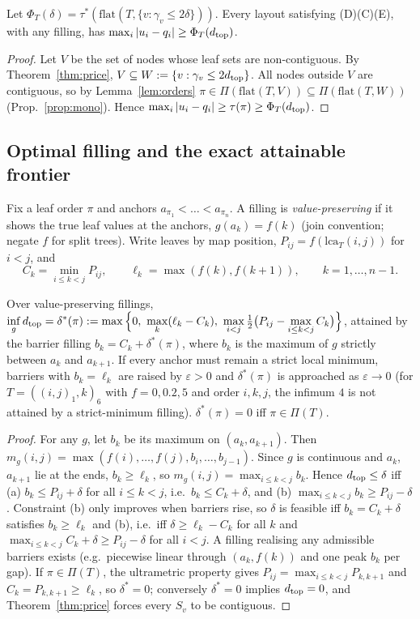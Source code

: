 \documentclass[11pt]{article}
\theoremstyle{remark}\newtheorem{remark}{Remark}
\begin{document}
\begin{corollary}\label{cor:frontier}Let $\Phi_T(\delta)=\tau^*(\mathrm{flat}(T,\{v:\gamma_v\le2\delta\}))$. Every layout satisfying (D)(C)(E), with any filling, has $\max_i|u_i-q_i|\ge\Phi_T(d_{\rm top})$.\end{corollary}
\begin{proof}Let $V$ be the set of nodes whose leaf sets are non-contiguous. By Theorem~\ref{thm:price}, $V\subseteq W:=\{v:\gamma_v\le 2d_{\rm top}\}$. All nodes outside $V$ are contiguous, so by Lemma~\ref{lem:orders} $\pi\in\Pi(\mathrm{flat}(T,V))\subseteq\Pi(\mathrm{flat}(T,W))$ (Prop.~\ref{prop:mono}). Hence $\max_i|u_i-q_i|\ge\tau(\pi)\ge\Phi_T(d_{\rm top})$.\end{proof}

\subsection*{Optimal filling and the exact attainable frontier}
Fix a leaf order $\pi$ and anchors $a_{\pi_1}<\dots<a_{\pi_n}$. A filling is \emph{value-preserving} if it shows the true leaf values at the anchors, $g(a_k)=f(k)$ (join convention; negate $f$ for split trees). Write leaves by map position, $P_{ij}=f(\mathrm{lca}_T(i,j))$ for $i<j$, and
\[C_k=\min_{i\le k<j}P_{ij},\qquad \ell_k=\max(f(k),f(k+1)),\qquad k=1,\dots,n-1.\]
\begin{proposition}\label{prop:fill}
Over value-preserving fillings, $\displaystyle\inf_g d_{\rm top}=\delta^*(\pi):=\max\Big\{0,\ \max_k(\ell_k-C_k),\ \max_{i<j}\tfrac12\big(P_{ij}-\max_{i\le k<j}C_k\big)\Big\}$, attained by the barrier filling $b_k=C_k+\delta^*(\pi)$, where $b_k$ is the maximum of $g$ strictly between $a_k$ and $a_{k+1}$. If every anchor must remain a strict local minimum, barriers with $b_k=\ell_k$ are raised by $\varepsilon>0$ and $\delta^*(\pi)$ is approached as $\varepsilon\to0$ (for $T=((i,j)_1,k)_6$ with $f=0,0.2,5$ and order $i,k,j$, the infimum $4$ is not attained by a strict-minimum filling). $\delta^*(\pi)=0$ iff $\pi\in\Pi(T)$.
\end{proposition}
\begin{proof}For any $g$, let $b_k$ be its maximum on $(a_k,a_{k+1})$. Then $m_g(i,j)=\max(f(i),\dots,f(j),b_i,\dots,b_{j-1})$. Since $g$ is continuous and $a_k$, $a_{k+1}$ lie at the ends, $b_k\ge\ell_k$, so $m_g(i,j)=\max_{i\le k<j}b_k$. Hence $d_{\rm top}\le\delta$ iff (a) $b_k\le P_{ij}+\delta$ for all $i\le k<j$, i.e.\ $b_k\le C_k+\delta$, and (b) $\max_{i\le k<j}b_k\ge P_{ij}-\delta$. Constraint (b) only improves when barriers rise, so $\delta$ is feasible iff $b_k=C_k+\delta$ satisfies $b_k\ge\ell_k$ and (b), i.e.\ iff $\delta\ge\ell_k-C_k$ for all $k$ and $\max_{i\le k<j}C_k+\delta\ge P_{ij}-\delta$ for all $i<j$. A filling realising any admissible barriers exists (e.g.\ piecewise linear through $(a_k,f(k))$ and one peak $b_k$ per gap). If $\pi\in\Pi(T)$, the ultrametric property gives $P_{ij}=\max_{i\le k<j}P_{k,k+1}$ and $C_k=P_{k,k+1}\ge\ell_k$, so $\delta^*=0$; conversely $\delta^*=0$ implies $d_{\rm top}=0$, and Theorem~\ref{thm:price} forces every $S_v$ to be contiguous.\end{proof}
\end{document}
